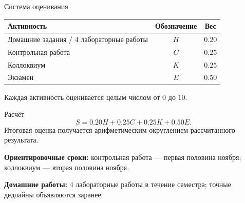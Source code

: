\documentclass[aspectratio=169,10pt]{beamer}
\begin{document}
\begin{frame}{Система оценивания}
\small

\begin{center}
\begin{tabular}{@{}lcc@{}}
\toprule
\textbf{Активность} & \textbf{Обозначение} & \textbf{Вес} \\
\midrule
Домашние задания / 4 лабораторные работы & $H$ & $0.20$ \\
Контрольная работа & $C$ & $0.25$ \\
Коллоквиум & $K$ & $0.25$ \\
Экзамен & $E$ & $0.50$ \\
\bottomrule
\end{tabular}
\end{center}

\vspace{0.35em}
Каждая активность оценивается целым числом от $0$ до $10$.

\begin{block}{Расчёт}
\[
S=0.20H+0.25C+0.25K+0.50E.
\]
Итоговая оценка получается арифметическим округлением рассчитанного результата.
\end{block}

\vspace{0.2em}
\textbf{Ориентировочные сроки:}
контрольная работа --- первая половина ноября; коллоквиум --- вторая половина ноября.

\vspace{0.45em}
\textbf{Домашние работы:}
4 лабораторные работы в течение семестра; точные дедлайны объявляются заранее.
\end{frame}
\end{document}
